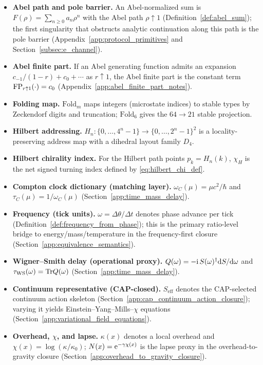 \begin{itemize}
\item \textbf{Abel path and pole barrier.}
An Abel-normalized sum is $F(\rho)=\sum_{n\ge 0} a_n\rho^n$ with the Abel path $\rho\uparrow 1$ (Definition~\ref{def:abel_sum}); the first singularity that obstructs analytic continuation along this path is the pole barrier (Appendix~\ref{app:protocol_primitives} and Section~\ref{subsec:e_channel}).
\item \textbf{Abel finite part.}
If an Abel generating function admits an expansion $c_{-1}/(1-r)+c_0+\cdots$ as $r\uparrow 1$, the Abel finite part is the constant term $\mathrm{FP}_{r\uparrow 1}(\cdot)=c_0$ (Appendix~\ref{app:abel_finite_part_notes}).
\item \textbf{Folding map.}
$\mathrm{Fold}_m$ maps integers (microstate indices) to stable types by Zeckendorf digits and truncation; $\mathrm{Fold}_6$ gives the $64\to 21$ stable projection.
\item \textbf{Hilbert addressing.}
$H_n:\{0,\dots,4^n-1\}\to\{0,\dots,2^n-1\}^2$ is a locality-preserving address map with a dihedral layout family $D_4$.
\item \textbf{Hilbert chirality index.}
For the Hilbert path points $p_k=H_n(k)$, $\chi_H$ is the net signed turning index defined by \eqref{eq:hilbert_chi_def}.
\item \textbf{Compton clock dictionary (matching layer).}
$\omega_C(\mu)=\mu c^2/\hbar$ and $\tau_C(\mu)=1/\omega_C(\mu)$ (Section~\ref{app:time_mass_delay}).
\item \textbf{Frequency (tick units).}
$\omega=\Delta\theta/\Delta t$ denotes phase advance per tick (Definition~\ref{def:frequency_from_phase}); this is the primary ratio-level bridge to energy/mass/temperature in the frequency-first closure (Section~\ref{app:equivalence_semantics}).
\item \textbf{Wigner--Smith delay (operational proxy).}
$Q(\omega)=-\mathrm{i}\,S(\omega)^\dagger \mathrm{d} S/\mathrm{d}\omega$ and $\tau_{\mathrm{WS}}(\omega)=\mathrm{Tr} Q(\omega)$ (Section~\ref{app:time_mass_delay}).
\item \textbf{Continuum representative (CAP-closed).}
$S_{\mathrm{eff}}$ denotes the CAP-selected continuum action skeleton (Section~\ref{app:cap_continuum_action_closure}); varying it yields Einstein--Yang--Mills--$\chi$ equations (Section~\ref{app:variational_field_equations}).
\item \textbf{Overhead, $\chi$, and lapse.}
$\kappa(x)$ denotes a local overhead and $\chi(x)=\log(\kappa/\kappa_0)$; $N(x)=\mathrm{e}^{-\gamma\chi(x)}$ is the lapse proxy in the overhead-to-gravity closure (Section~\ref{app:overhead_to_gravity_closure}).

\end{itemize}
